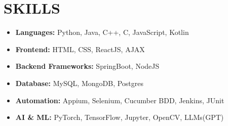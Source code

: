 \documentclass[letterpaper,11pt]{article}
\newcommand{\resumeItem}[1]{
  \item\small{
    {#1 \vspace{-2pt}}
  }
}
\newcommand{\resumeSubHeadingListStart}{\begin{itemize}[leftmargin=0.15in, label={}]}
\newcommand{\resumeSubHeadingListEnd}{\end{itemize}}
\begin{document}
\section{\textbf{SKILLS}}

\resumeSubHeadingListStart
\resumeItem{\textbf{Languages:} Python, Java, C++, C, JavaScript, Kotlin}
\vspace{-7pt}
\resumeItem{\textbf{Frontend:} HTML, CSS, ReactJS, AJAX}
\vspace{-7pt}
\resumeItem{\textbf{Backend Frameworks:} SpringBoot, NodeJS}

\vspace{-7pt}
\resumeItem{\textbf{Database:} MySQL, MongoDB, Postgres}
\vspace{-7pt}
\resumeItem{\textbf{Automation:} Appium, Selenium, Cucumber BDD, Jenkins, JUnit}
\vspace{-7pt}

\resumeItem{\textbf{AI \& ML:} PyTorch, TensorFlow, Jupyter, OpenCV, LLMs(GPT) }
\vspace{-7pt}


\resumeSubHeadingListEnd

\vspace{-10pt}
\end{document}
